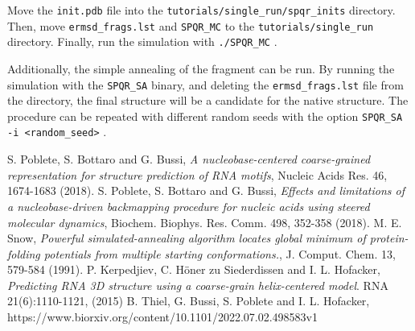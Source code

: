 \documentclass{article}
\begin{document}
Move the \texttt{init.pdb} file into the \texttt{tutorials/single\_run/spqr\_inits} directory.
Then, move \texttt{ermsd\_frags.lst} and \texttt{SPQR\_MC} to the \texttt{tutorials/single\_run} directory. Finally, run the simulation with \texttt{./SPQR\_MC} .

Additionally, the simple annealing of the fragment can be run. By running the simulation with the \texttt{SPQR\_SA} binary, and deleting the \texttt{ermsd\_frags.lst} file from the directory, the final structure will be a candidate for the native structure. The procedure can be repeated with different random seeds with the option \texttt{SPQR\_SA -i <random\_seed>} .



\begin{thebibliography}{99}
   S. Poblete, S. Bottaro and G. Bussi, {\it A nucleobase-centered coarse-grained representation for structure prediction of RNA motifs}, Nucleic Acids Res. 46, 1674-1683 (2018).
   S. Poblete, S. Bottaro and G. Bussi, {\it Effects and limitations of a nucleobase-driven backmapping procedure for nucleic acids using steered molecular dynamics}, Biochem. Biophys. Res. Comm. 498, 352-358 (2018).
     M. E. Snow, {\it Powerful simulated-annealing algorithm locates global minimum of protein-folding potentials from multiple starting conformations.}, J. Comput. Chem. 13, 579-584 (1991).
     P. Kerpedjiev, C. Höner zu Siederdissen and I. L. Hofacker, {\it Predicting RNA 3D structure using a coarse-grain helix-centered model}. RNA 21(6):1110-1121, (2015)
     B. Thiel, G. Bussi, S. Poblete and I. L. Hofacker, https://www.biorxiv.org/content/10.1101/2022.07.02.498583v1
    
\end{thebibliography}
\end{document}
